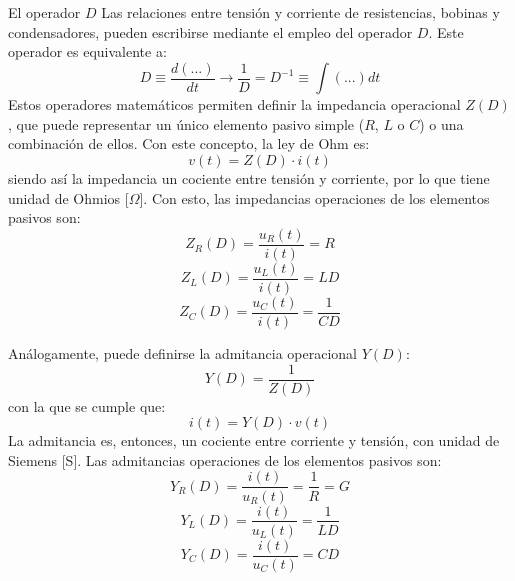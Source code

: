 \documentclass[11pt]{book} %
\makeatletter
\numberwithin{dummy}{section}
\theoremstyle{ocrenumbox}
\theoremstyle{blacknumex}
\theoremstyle{blacknumbox}
\theoremstyle{ocrenum}
\renewcommand{\subsubsection}{\@startsection {subsubsection}{3}{\z@}
{-2ex \@plus -0.1ex \@minus -.2ex}
{.2ex \@plus.2ex }
{\normalfont\small\sffamily\bfseries}}
\makeatother
\begin{document}
	\subsubsection{El operador $D$}\label{sec.operador_D}
	Las relaciones entre tensión y corriente de resistencias, bobinas y condensadores, pueden escribirse mediante el empleo del operador $D$. Este operador es equivalente a:
	\begin{equation*}
		D\equiv \dfrac{d(...)}{dt} \rightarrow \dfrac{1}{D}=D^{-1}\equiv \int (...) dt
	\end{equation*}
	Estos operadores matemáticos permiten definir la impedancia operacional $Z(D)$, que puede representar un único elemento pasivo simple ($R$, $L$ o $C$) o una combinación de ellos. Con este concepto, la ley de Ohm es:
	\begin{equation*}
		v(t)=Z(D)\cdot i(t)
	\end{equation*}
	siendo así la impedancia un cociente entre tensión y corriente, por lo que tiene unidad de Ohmios [$\Omega$].  Con esto, las impedancias operaciones de los elementos pasivos son: 
	\begin{equation*}
		Z_R(D)=\dfrac{u_R(t)}{i(t)}=R
	\end{equation*}
	\begin{equation*}
		Z_L(D)=\dfrac{u_L(t)}{i(t)}=LD
	\end{equation*}
	\begin{equation*}
		Z_C(D)=\dfrac{u_C(t)}{i(t)}=\dfrac{1}{CD}
	\end{equation*}
	
	Análogamente, puede definirse la admitancia operacional $Y(D)$:
	\begin{equation*}
		Y(D)=\dfrac{1}{Z(D)}
	\end{equation*}
	con la que se cumple que:
	\begin{equation*}
		i(t)=Y(D)\cdot v(t)
	\end{equation*}
	La admitancia es, entonces, un cociente entre corriente y tensión, con unidad de Siemens [S]. Las admitancias operaciones de los elementos pasivos son: 
	\begin{equation*}
		Y_R(D)=\dfrac{i(t)}{u_R(t)}=\dfrac{1}{R}=G
	\end{equation*}
	\begin{equation*}
		Y_L(D)=\dfrac{i(t)}{u_L(t)}=\dfrac{1}{LD}
	\end{equation*}
	\begin{equation*}
		Y_C(D)=\dfrac{i(t)}{u_C(t)}=CD
	\end{equation*} 
	
\end{document}
